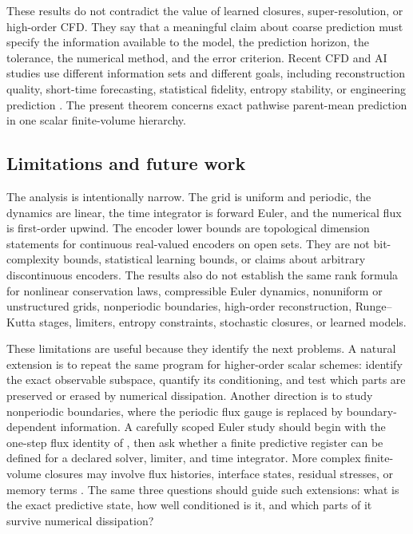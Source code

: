 \documentclass[pdflatex,sn-mathphys-num]{sn-jnl}%
\theoremstyle{thmstyleone}%
\theoremstyle{thmstyletwo}%
\theoremstyle{thmstylethree}%
\begin{document}
These results do not contradict the value of learned closures, super-resolution, or high-order CFD.  They say that a meaningful claim about
coarse prediction must specify the information available to the model, the
prediction horizon, the tolerance, the numerical method, and the error
criterion.  Recent CFD and AI studies use different information sets and
different goals, including reconstruction quality, short-time forecasting, statistical fidelity, entropy stability, or engineering prediction
\cite{Sofos:2025spatiotemporal,
Liu:2026entropyCFN,Charles:2025dspweno}.  The present theorem concerns exact
pathwise parent-mean prediction in one scalar finite-volume hierarchy.

\subsection{Limitations and future work}
\label{sec:limitations}

The analysis is intentionally narrow.  The grid is uniform and periodic, the
dynamics are linear, the time integrator is forward Euler, and the numerical
flux is first-order upwind.  The encoder lower bounds are topological
dimension statements for continuous real-valued encoders on open sets.  They
are not bit-complexity bounds, statistical learning bounds, or claims about
arbitrary discontinuous encoders.  The results also do not establish the same
rank formula for nonlinear conservation laws, compressible Euler dynamics,
nonuniform or unstructured grids, nonperiodic boundaries, high-order
reconstruction, Runge--Kutta stages, limiters, entropy constraints, stochastic
closures, or learned models.

These limitations are useful because they identify the next problems.  A
natural extension is to repeat the same program for higher-order scalar
schemes: identify the exact observable subspace, quantify its conditioning,
and test which parts are preserved or erased by numerical dissipation.
Another direction is to study nonperiodic boundaries, where the periodic flux
gauge is replaced by boundary-dependent information.  A carefully scoped
Euler study should begin with the one-step flux identity of
, then ask whether a finite predictive register can
be defined for a declared solver, limiter, and time integrator.  More complex
finite-volume closures may involve flux histories, interface states,
residual stresses, or memory terms
\cite{ChorinHaldKupferman:2002memory,ParishDuraisamy:2017nonmarkovian,
Agdestein:2026exactfvclosure}.  The same three questions should guide such
extensions: what is the exact predictive state, how well conditioned is it,
and which parts of it survive numerical dissipation?
\end{document}
